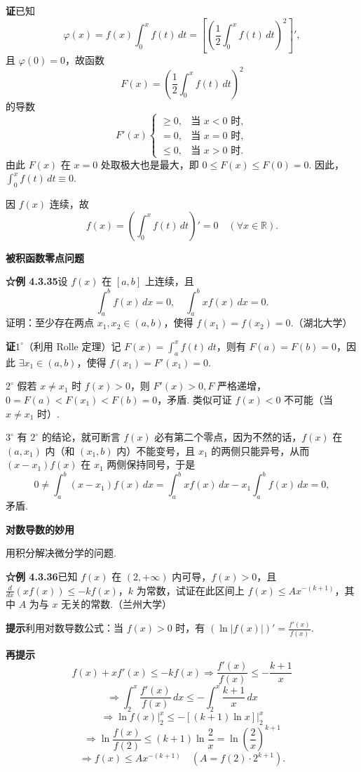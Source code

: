 \documentclass[UTF8,12pt,a4paper,fontset=fandol]{ctexart}
\begin{document}
\noindent\textbf{证}\quad 已知
\[
\varphi(x)=f(x)\int_0^x f(t)\,dt
=\left[\left(\frac12\int_0^x f(t)\,dt\right)^2\right]',
\]
且 $\varphi(0)=0$，故函数
\[
F(x)=\left(\frac12\int_0^x f(t)\,dt\right)^2
\]
的导数
\[
F'(x)
\begin{cases}
\ge0, & \text{当 }x<0\text{ 时},\\
=0, & \text{当 }x=0\text{ 时},\\
\le0, & \text{当 }x>0\text{ 时}.
\end{cases}
\]
由此 $F(x)$ 在 $x=0$ 处取极大也是最大，即 $0\le F(x)\le F(0)=0$. 因此，$\int_0^x f(t)\,dt\equiv0$.

因 $f(x)$ 连续，故
\[
f(x)=\left(\int_0^x f(t)\,dt\right)'=0\quad(\forall x\in\mathbb{R}).
\]

\noindent\textbf{被积函数零点问题}

\noindent\textbf{☆例 4.3.35}\quad 设 $f(x)$ 在 $[a,b]$ 上连续，且
\[
\int_a^b f(x)\,dx=0,\quad \int_a^b xf(x)\,dx=0.
\]
证明：至少存在两点 $x_1,x_2\in(a,b)$，使得 $f(x_1)=f(x_2)=0$.（湖北大学）

\noindent\textbf{证}\quad $1^\circ$（利用 Rolle 定理）记 $F(x)=\int_a^x f(t)\,dt$，则有 $F(a)=F(b)=0$，因此 $\exists x_1\in(a,b)$，使得 $f(x_1)=F'(x_1)=0$.

\noindent $2^\circ$ 假若 $x\ne x_1$ 时 $f(x)>0$，则 $F'(x)>0,F$ 严格递增，$0=F(a)<F(x_1)<F(b)=0$，矛盾. 类似可证 $f(x)<0$ 不可能（当 $x\ne x_1$ 时）.

\noindent $3^\circ$ 有 $2^\circ$ 的结论，就可断言 $f(x)$ 必有第二个零点，因为不然的话，$f(x)$ 在 $(a,x_1)$ 内（和 $(x_1,b)$ 内）不能变号，且 $x_1$ 的两侧只能异号，从而 $(x-x_1)f(x)$ 在 $x_1$ 两侧保持同号，于是
\[
0\ne\int_a^b(x-x_1)f(x)\,dx
=\int_a^b xf(x)\,dx-x_1\int_a^b f(x)\,dx=0,
\]
矛盾.

\noindent\textbf{对数导数的妙用}

\noindent 用积分解决微分学的问题.

\noindent\textbf{☆例 4.3.36}\quad 已知 $f(x)$ 在 $(2,+\infty)$ 内可导，$f(x)>0$，且 $\frac{d}{dx}(xf(x))\le-kf(x)$，$k$ 为常数，试证在此区间上 $f(x)\le Ax^{-(k+1)}$，其中 $A$ 为与 $x$ 无关的常数.（兰州大学）

\noindent\textbf{提示}\quad 利用对数导数公式：当 $f(x)>0$ 时，有 $(\ln|f(x)|)'=\frac{f'(x)}{f(x)}$.

\noindent\textbf{再提示}\quad
\[
f(x)+xf'(x)\le-kf(x)
\Rightarrow\frac{f'(x)}{f(x)}\le-\frac{k+1}{x}
\]
\[
\Rightarrow\int_2^x\frac{f'(x)}{f(x)}\,dx
\le-\int_2^x\frac{k+1}{x}\,dx
\]
\[
\Rightarrow \ln f(x)\bigg|_2^x
\le-[(k+1)\ln x]\bigg|_2^x
\]
\[
\Rightarrow\ln\frac{f(x)}{f(2)}
\le(k+1)\ln\frac2x
=\ln\left(\frac2x\right)^{k+1}
\]
\[
\Rightarrow f(x)\le Ax^{-(k+1)}
\quad(A=f(2)\cdot2^{k+1}).
\]
\end{document}
